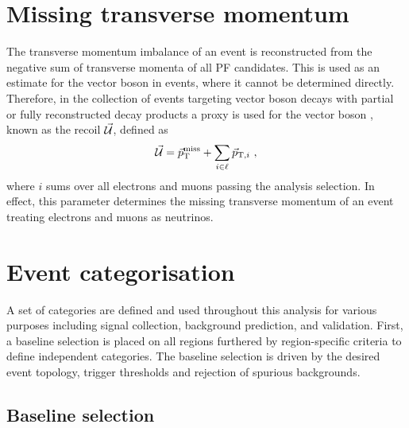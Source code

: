 \section{Missing transverse momentum}

The transverse momentum imbalance of an event is reconstructed from the negative sum of transverse momenta of all PF candidates. This is used as an estimate for the vector boson \pt in \IZvvj events, where it cannot be determined directly. Therefore, in the collection of events targeting vector boson decays with partial or fully reconstructed decay products a proxy is used for the vector boson \vecpt, known as the recoil $\vec{\mathcal{U}}$, defined as
%
\begin{equation}
    \vec{\mathcal{U}} = \vec{p}_{\mathrm{T}}^{\mathrm{miss}} + \sum_{i\in\ell} \vec{p}_{\mathrm{T},i}\ ,
\end{equation}
%
where $i$ sums over all electrons and muons passing the analysis selection. In effect, this parameter determines the missing transverse momentum of an event treating electrons and muons as neutrinos.


\section{Event categorisation}

A set of categories are defined and used throughout this analysis for various
purposes including signal collection, background prediction, and validation.
First, a baseline selection is placed on all regions furthered by
region-specific criteria to define independent categories. The baseline
selection is driven by the desired event topology, trigger thresholds and
rejection of spurious \ptmiss backgrounds.


\subsection{Baseline selection}\label{sec:baseline-selection}

